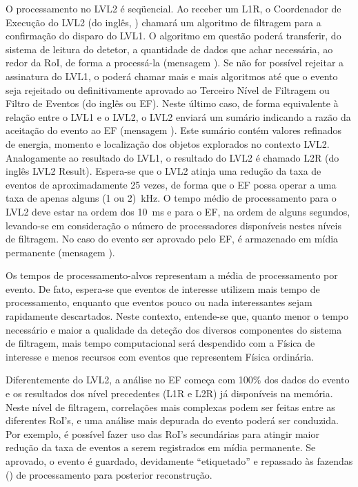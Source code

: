 O processamento no LVL2 é seqüencial. Ao receber um L1R, o Coordenador de
Execução do LVL2 (do inglês, ) chamará um algoritmo de filtragem
para a confirmação do disparo do LVL1. O algoritmo em questão poderá
transferir, do sistema de leitura do detetor, a quantidade de dados que achar
necessária, ao redor da RoI, de forma a processá-la (mensagem ). Se
não for possível rejeitar a assinatura do LVL1, o  poderá chamar
mais e mais algoritmos até que o evento seja rejeitado ou definitivamente
aprovado ao Terceiro Nível de Filtragem ou Filtro de Eventos (do inglês
 ou EF). Neste último caso, de forma equivalente à relação
entre o LVL1 e o LVL2, o LVL2 enviará um sumário indicando a razão da
aceitação do evento ao EF (mensagem ). Este sumário contém valores
refinados de energia, momento e localização dos objetos explorados no contexto
LVL2. Analogamente ao resultado do LVL1, o resultado do LVL2 é chamado L2R (do
inglês {LVL2 Result}). Espera-se que o LVL2 atinja uma redução da taxa de
eventos de aproximadamente 25 vezes, de forma que o EF possa operar a uma taxa
de apenas alguns (1 ou 2)~kHz. O tempo médio de processamento para o LVL2 deve
estar na ordem dos 10~ms e para o EF, na ordem de alguns segundos, levando-se
em consideração o número de processadores disponíveis nestes níveis de
filtragem. No caso do evento ser aprovado pelo EF, é armazenado em mídia
permanente (mensagem
).

Os tempos de processamento-alvos representam a média de processamento por
evento. De fato, espera-se que eventos de interesse utilizem mais tempo de
processamento, enquanto que eventos pouco ou nada interessantes sejam
rapidamente descartados. Neste contexto, entende-se que, quanto menor o tempo
necessário e maior a qualidade da deteção dos diversos componentes do sistema
de filtragem, mais tempo computacional será despendido com a Física de
interesse e menos recursos com eventos que representem Física ordinária.

Diferentemente do LVL2, a análise no EF começa com 100\% dos dados do evento e
os resultados dos nível precedentes (L1R e L2R) já disponíveis na
memória. Neste nível de filtragem, correlações mais complexas podem ser feitas
entre as diferentes RoI's, e uma análise mais depurada do evento poderá ser
conduzida. Por exemplo, é possível fazer uso das RoI's secundárias para
atingir maior redução da taxa de eventos a serem registrados em mídia
permanente. Se aprovado, o evento é guardado, devidamente ``etiquetado'' e
repassado às fazendas () de processamento  para
posterior reconstrução.

